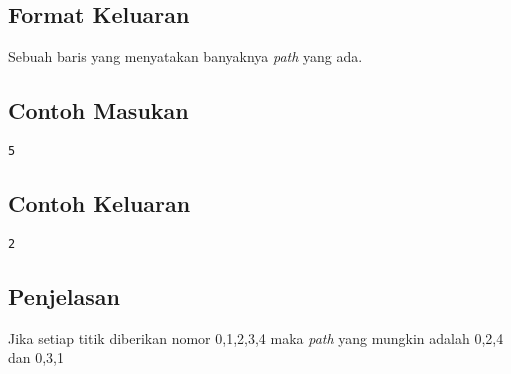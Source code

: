 \documentclass{article}
\begin{document}
\subsection*{Format Keluaran}
Sebuah baris yang menyatakan banyaknya \textit{path} yang ada.
\\

\begin{multicols}{2}
\subsection*{Contoh Masukan}
\begin{lstlisting}
5
\end{lstlisting}
\columnbreak
\subsection*{Contoh Keluaran}
\begin{lstlisting}
2
\end{lstlisting}
\vfill
\null
\end{multicols}

\subsection*{Penjelasan}
Jika setiap titik diberikan nomor 0,1,2,3,4 maka \textit{path} yang mungkin adalah 0,2,4 dan 0,3,1

\pagebreak
\end{document}
